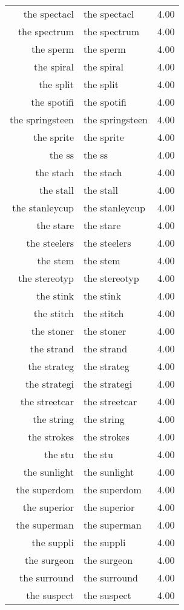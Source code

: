 \begin{table}[ht]
\begin{tabular}{rlr}
  the spectacl & the spectacl & 4.00 \\ 
  the spectrum & the spectrum & 4.00 \\ 
  the sperm & the sperm & 4.00 \\ 
  the spiral & the spiral & 4.00 \\ 
  the split & the split & 4.00 \\ 
  the spotifi & the spotifi & 4.00 \\ 
  the springsteen & the springsteen & 4.00 \\ 
  the sprite & the sprite & 4.00 \\ 
  the ss & the ss & 4.00 \\ 
  the stach & the stach & 4.00 \\ 
  the stall & the stall & 4.00 \\ 
  the stanleycup & the stanleycup & 4.00 \\ 
  the stare & the stare & 4.00 \\ 
  the steelers & the steelers & 4.00 \\ 
  the stem & the stem & 4.00 \\ 
  the stereotyp & the stereotyp & 4.00 \\ 
  the stink & the stink & 4.00 \\ 
  the stitch & the stitch & 4.00 \\ 
  the stoner & the stoner & 4.00 \\ 
  the strand & the strand & 4.00 \\ 
  the strateg & the strateg & 4.00 \\ 
  the strategi & the strategi & 4.00 \\ 
  the streetcar & the streetcar & 4.00 \\ 
  the string & the string & 4.00 \\ 
  the strokes & the strokes & 4.00 \\ 
  the stu & the stu & 4.00 \\ 
  the sunlight & the sunlight & 4.00 \\ 
  the superdom & the superdom & 4.00 \\ 
  the superior & the superior & 4.00 \\ 
  the superman & the superman & 4.00 \\ 
  the suppli & the suppli & 4.00 \\ 
  the surgeon & the surgeon & 4.00 \\ 
  the surround & the surround & 4.00 \\ 
  the suspect & the suspect & 4.00 \\ 

\end{tabular}
\end{table}
